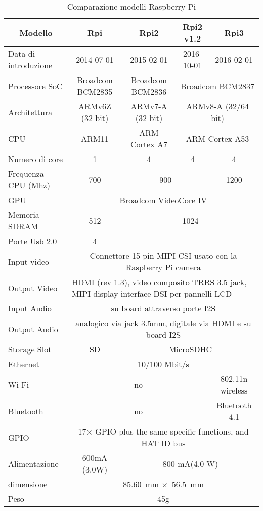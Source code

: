 \begin{landscape}
\begin{table}[htbp]
	\caption{Comparazione modelli Raspberry Pi}
	\begin{tabular}{|l|c|c|c|c|}
		\hline
		\multicolumn{1}{|c|}{\textbf{Modello}} & \textbf{Rpi} & \textbf{Rpi2} & \textbf{Rpi2 v1.2} & \textbf{Rpi3} \\ \hline
		Data di introduzione & 2014-07-01 & 2015-02-01 & 2016-10-01 & 2016-02-01 \\ \hline
		Processore SoC & Broadcom BCM2835 & Broadcom BCM2836 & \multicolumn{ 2}{c|}{Broadcom BCM2837} \\ \hline
		Architettura & ARMv6Z (32 bit) & ARMv7-A (32 bit) & \multicolumn{ 2}{c|}{ARMv8-A (32/64 bit)} \\ \hline
		CPU & ARM11 & ARM Cortex A7 & \multicolumn{ 2}{c|}{ARM Cortex A53} \\ \hline
		Numero di core & 1 & 4 & 4 & 4 \\ \hline
		Frequenza CPU (Mhz) & 700 & \multicolumn{ 2}{c|}{900} & 1200 \\ \hline
		GPU & \multicolumn{ 4}{c|}{Broadcom VideoCore IV} \\ \hline
		Memoria SDRAM & 512 & \multicolumn{ 3}{c|}{1024} \\ \hline
		Porte Usb 2.0 & 4 &  &  &  \\ \hline
		Input video & \multicolumn{ 4}{c|}{Connettore 15-pin MIPI  CSI usato con la Raspberry Pi camera} \\ \hline
		Output Video & \multicolumn{ 4}{l|}{HDMI (rev 1.3), video composito TRRS 3.5 jack, MIPI display interface DSI per pannelli LCD} \\ \hline
		Input Audio & \multicolumn{ 4}{c|}{su board attraverso porte I2S} \\ \hline
		Output Audio & \multicolumn{ 4}{c|}{analogico via jack 3.5mm, digitale via HDMI e su board I2S} \\ \hline
		Storage Slot & SD & \multicolumn{ 3}{c|}{MicroSDHC} \\ \hline
		Ethernet & \multicolumn{ 4}{c|}{10/100 Mbit/s} \\ \hline
		Wi-Fi & \multicolumn{ 3}{c|}{no} & 802.11n wireless \\ \hline
		Bluetooth & \multicolumn{ 3}{c|}{no} & Bluetooth 4.1 \\ \hline
		GPIO & \multicolumn{ 4}{c|}{17× GPIO plus the same specific functions, and HAT ID bus } \\ \hline
		Alimentazione & 600mA (3.0W) & \multicolumn{ 3}{c|}{800 mA(4.0 W)} \\ \hline
		dimensione & \multicolumn{ 4}{c|}{85.60 mm × 56.5 mm } \\ \hline
		Peso  & \multicolumn{ 4}{c|}{45g} \\ \hline
	\end{tabular}
	
	\label{tab:rpi_ver}
\end{table}
\end{landscape}

